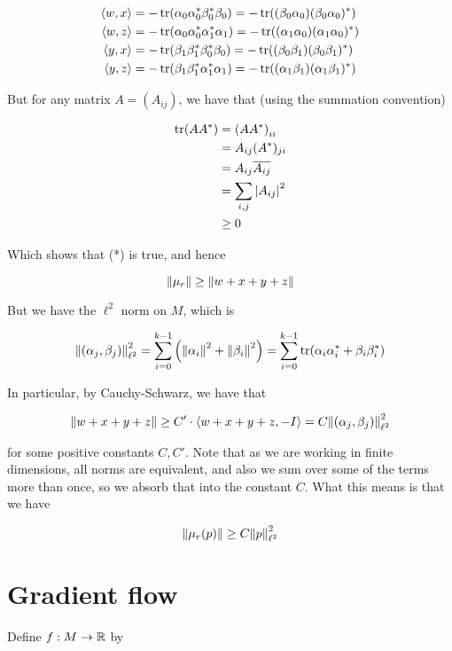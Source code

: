 \documentclass{article}
\begin{document}
\begin{align*}
    \left\langle w, x \right\rangle &= -\tr(\alpha_0\alpha_0^*\beta_0^*\beta_0) = -\tr((\beta_0\alpha_0)(\beta_0\alpha_0)^*) \\
    \left\langle w, z \right\rangle &= -\tr(\alpha_0\alpha_0^*\alpha_1^*\alpha_1) = -\tr((\alpha_1\alpha_0)(\alpha_1\alpha_0)^*) \\
    \left\langle y, x \right\rangle &= -\tr(\beta_1\beta_1^*\beta_0^*\beta_0) = -\tr((\beta_0\beta_1)(\beta_0\beta_1)^*) \\
    \left\langle y, z \right\rangle &= -\tr(\beta_1\beta_1^*\alpha_1^*\alpha_1) = -\tr((\alpha_1\beta_1)(\alpha_1\beta_1)^*)
\end{align*}

But for any matrix \(A = (A_{ij})\), we have that (using the summation convention)

\begin{align*}
    \tr(AA^*) &= \left(AA^*\right)_{ii} \\
    &= A_{ij}(A^*)_{ji} \\
    &= A_{ij}\overline{A_{ij}} \\
    &= \sum_{i, j}\abs{A_{ij}}^2 \\
    &\ge 0
\end{align*}

Which shows that (*) is true, and hence

\[\norm{\mu_r} \ge \norm{w+x+y+z}\]

But we have the \(\ell^2\) norm on \(M\), which is

\[\norm{(\alpha_j, \beta_j)}^2_{\ell^2} = \sum_{i=0}^{k-1}\left(\norm{\alpha_i}^2 + \norm{\beta_i}^2\right) = \sum_{i=0}^{k-1}\tr(\alpha_i\alpha_i^* + \beta_i\beta_i^*)\]

In particular, by Cauchy-Schwarz, we have that

\[\norm{w + x + y + z} \ge C' \cdot \left\langle w+x+y+z, -I \right\rangle = C \norm{(\alpha_j, \beta_j)}_{\ell^2}^2\]

for some positive constants \(C, C'\). Note that as we are working in finite dimensions, all norms are equivalent, and also we sum over some of the terms more than once, so we absorb that into the constant \(C\). What this means is that we have

\[\norm{\mu_r(p)} \ge C\norm{p}^2_{\ell^2}\]

\section{Gradient flow}

Define \(f : M \to \mathbb{R}\) by
\end{document}
